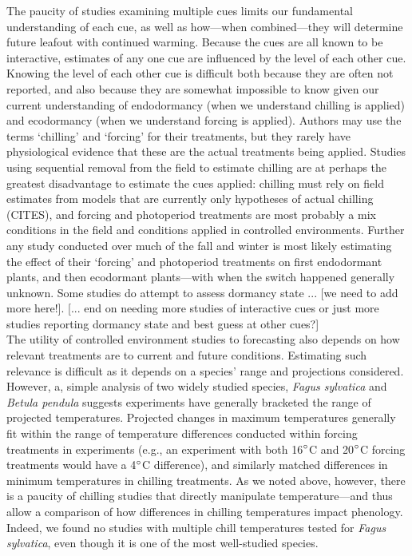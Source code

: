 \documentclass[11pt,letter]{article}
\begin{document}
The paucity of studies examining multiple cues limits our fundamental understanding of each cue, as well as how---when combined---they will determine future leafout with continued warming. Because the cues are all known to be interactive, estimates of any one cue are influenced by the level of each other cue. Knowing the level of each other cue is difficult both because they are often not reported, and also because they are somewhat impossible to know given our current understanding of endodormancy (when we understand chilling is applied) and ecodormancy (when we understand forcing is applied). Authors may use the terms `chilling' and `forcing' for their treatments, but they rarely have physiological evidence that these are the actual treatments being applied. Studies using sequential removal from the field to estimate chilling are at perhaps the greatest disadvantage to estimate the cues applied: chilling must rely on field estimates from models that are currently only hypotheses of actual chilling (CITES), and forcing and photoperiod treatments are most probably a mix conditions in the field and conditions applied in controlled environments. Further any study conducted over much of the fall and winter is most likely estimating the effect of their `forcing' and photoperiod treatments on first endodormant plants, and then ecodormant plants---with when the switch happened generally unknown. Some studies do attempt to assess dormancy state ... [we need to add more here!]. [... end on needing more studies of interactive cues or just more studies reporting dormancy state and best guess at other cues?]\\

The utility of controlled environment studies to forecasting also depends on how relevant treatments are to current and future conditions. Estimating such relevance is difficult as it depends on a species' range and projections considered. However, a, simple analysis of two widely studied species, \emph{Fagus sylvatica} and \emph{Betula pendula} suggests experiments have generally bracketed the range of projected temperatures. Projected changes in maximum temperatures generally fit within the range of temperature differences conducted within forcing treatments in experiments (e.g., an experiment with both 16$\degree$C  and 20$\degree$C forcing treatments would have a 4$\degree$C difference), and similarly matched differences in minimum temperatures in chilling treatments. As we noted above, however, there is a paucity of chilling studies that directly manipulate temperature---and thus allow a comparison of how differences in chilling temperatures impact phenology. Indeed, we found no studies with multiple chill temperatures tested for \emph{Fagus sylvatica}, even though it is one of the most well-studied species. \\
\end{document}

